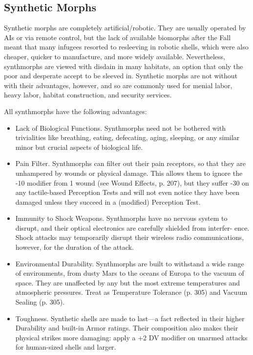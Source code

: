 \subsection{Synthetic Morphs}

Synthetic morphs are completely artificial/robotic.  They are usually operated
by AIs or via remote control, but the lack of available biomorphs after the
Fall meant that many infugees resorted to resleeving in robotic shells, which
were also cheaper, quicker to manufacture, and more widely
available. Nevertheless, synthmorphs are viewed with disdain in many habitats,
an option that only the poor and desperate accept to be sleeved in. Synthetic
morphs are not without with their advantages, however, and so are commonly used
for menial labor, heavy labor, habitat construction, and security services.

All synthmorphs have the following advantages:

\begin{itemize}
\item Lack of Biological Functions. Synthmorphs need not be bothered with
  trivialities like breathing, eating, defecating, aging, sleeping, or any
  similar minor but crucial aspects of biological life.
\item Pain Filter. Synthmorphs can filter out their pain receptors, so that
  they are unhampered by wounds or physical damage. This allows them to ignore
  the -10 modifier from 1 wound (see Wound Effects, p. 207), but they suffer
  -30 on any tactile-based Perception Tests and will not even notice they have
  been damaged unless they succeed in a (modified) Perception Test.
\item Immunity to Shock Weapons. Synthmorphs have no nervous system to disrupt,
  and their optical electronics are carefully shielded from interfer-
  ence. Shock attacks may temporarily disrupt their wireless radio
  communications, however, for the duration of the attack.
\item Environmental Durability. Synthmorphs are built to withstand a wide range
  of environments, from dusty Mars to the oceans of Europa to the vacuum of
  space. They are unaffected by any but the most extreme temperatures and
  atmospheric pressures. Treat as Temperature Tolerance (p.  305) and Vacuum
  Sealing (p. 305).
\item Toughness. Synthetic shells are made to last—a fact reflected in their
  higher Durability and built-in Armor ratings. Their composition also makes
  their physical strikes more damaging: apply a +2 DV modifier on unarmed
  attacks for human-sized shells and larger.
\end{itemize}

